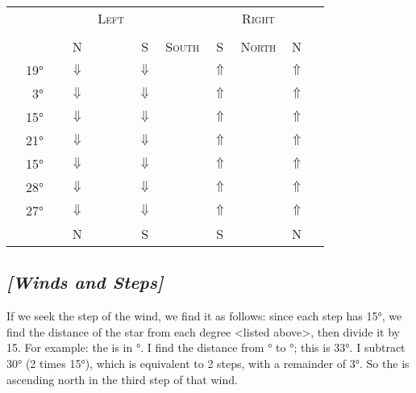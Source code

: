 \begin{footnotesize}
\begin{center}
\begin{tabular}{c r c c c c c c c c c}
&   &   	& 
			& \textsc{Left} 
			&  
			& 
			& 
			& \textsc{Right} 
			& 
			& \\
&   &  	&
			& \Square
			&
			& \Opposition
			&
			& \Square
			&
			& \\
&   &  & \textsc{N} 
			& 
			& \textsc{S} 
			& \textsc{South} 
			& \textsc{S}
			& \textsc{North}
			& \textsc{N} 
			& \\
\toprule
\Sun 		&	19° 	& \Aries 	 	&$\Downarrow$ 
							& \Cancer		&$\Downarrow$ 
							& \Libra		&$\Uparrow$
							& \Capricorn	&$\Uparrow$	
							& \Aries		\\
\Moon 		&	3°		& \Taurus		&$\Downarrow$
							& \Leo			&$\Downarrow$
							& \Scorpio	&$\Uparrow$ 
							& \Aquarius	&$\Uparrow$ 
							& \Taurus 	\\
\Jupiter		& 15° 	& \Cancer		&$\Downarrow$
							& \Libra		&$\Downarrow$
							& \Capricorn	&$\Uparrow$
							& \Aries		&$\Uparrow$
							& \Cancer		\\
\Saturn		& 21° 	& \Libra		&$\Downarrow$
							& \Capricorn	&$\Downarrow$
							& \Aries		&$\Uparrow$
							& \Cancer 	&$\Uparrow$
							& \Libra	\\				
\Mercury 	& 15°	& \Virgo		&$\Downarrow$
							& \Sagittarius &$\Downarrow$
							& \Pisces		&$\Uparrow$
							& \Gemini		&$\Uparrow$
							& \Virgo		\\										
\Mars		& 28°	& \Capricorn	&$\Downarrow$
							& \Aries		&$\Downarrow$
							& \Cancer		&$\Uparrow$
							& \Libra		&$\Uparrow$
							& \Capricorn 		\\	
\Venus	 	& 27°	& \Pisces		&$\Downarrow$
							& \Gemini		&$\Downarrow$
							& \Virgo		&$\Uparrow$
							& \Sagittarius	&$\Uparrow$
							& \Pisces	\\
\midrule
&   &   	& \textsc{N} 
			& 
			& \textsc{S} 
			& 
			& \textsc{S}
			& 
			& \textsc{N} 
			& \\
\bottomrule
\end{tabular}
\end{center}
\end{footnotesize}


\subsection{\textit{[Winds and Steps]}}
If we seek the step of the wind, we find it as follows: since each step has 15°, we find the distance of the star from each degree <listed above>, then divide it by 15. For example: the \Sun\xspace is in \Aquarius\xspace 22°. I find the distance from \Capricorn\xspace 19° to \Aquarius\xspace 22°; this is 33°. I subtract 30° (2 times 15°), which is equivalent to 2 steps, with a remainder of 3°. So the \Sun\xspace is ascending north in the third step of that wind.

